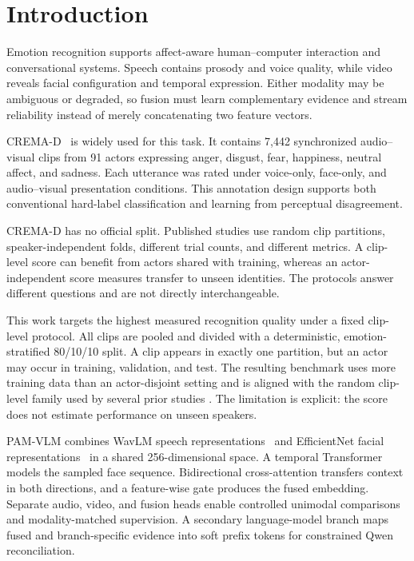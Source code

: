 \documentclass[conference]{IEEEtran}
\begin{document}
\section{Introduction}
\label{sec:intro}

Emotion recognition supports affect-aware human--computer interaction and
conversational systems. Speech contains prosody and voice quality, while video
reveals facial configuration and temporal expression. Either modality may be
ambiguous or degraded, so fusion must learn complementary evidence and stream
reliability instead of merely concatenating two feature vectors.

CREMA-D~\cite{cao2014crema} is widely used for this task. It contains 7,442
synchronized audio--visual clips from 91 actors expressing anger, disgust,
fear, happiness, neutral affect, and sadness. Each utterance was rated under
voice-only, face-only, and audio--visual presentation conditions. This
annotation design supports both conventional hard-label classification and
learning from perceptual disagreement.

CREMA-D has no official split. Published studies use random clip partitions,
speaker-independent folds, different trial counts, and different metrics. A
clip-level score can benefit from actors shared with training, whereas an
actor-independent score measures transfer to unseen identities. The protocols
answer different questions and are not directly interchangeable.

This work targets the highest measured recognition quality under a fixed
clip-level protocol. All clips are pooled and divided with a deterministic,
emotion-stratified 80/10/10 split. A clip appears in exactly one partition, but
an actor may occur in training, validation, and test. The resulting benchmark
uses more training data than an actor-disjoint setting and is aligned with the
random clip-level family used by several prior studies
\cite{wei2024otm,mocanu2023crossmodal,fmii2026}. The limitation is explicit:
the score does not estimate performance on unseen speakers.

PAM-VLM combines WavLM speech representations~\cite{chen2022wavlm} and
EfficientNet facial representations~\cite{tan2019efficientnet} in a shared
256-dimensional space. A temporal Transformer models the sampled face
sequence. Bidirectional cross-attention transfers context in both directions,
and a feature-wise gate produces the fused embedding. Separate audio, video,
and fusion heads enable controlled unimodal comparisons and modality-matched
supervision. A secondary language-model branch maps fused and branch-specific
evidence into soft prefix tokens for constrained Qwen reconciliation.
\end{document}
